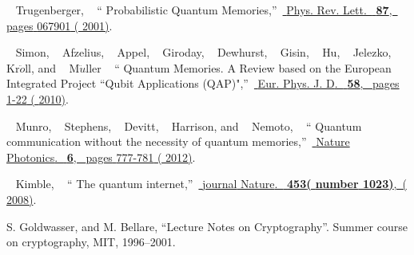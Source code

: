 \documentclass[aps,pra,twocolumn,groupedaddress,showpacs,showkeys]{revtex4-1}
\begin{document}
\begin{thebibliography}{27}
  \BibitemOpen
   { {~\bibnamefont
  {Trugenberger}, } \ }  {\enquote { {Probabilistic Quantum Memories},}\ }\href {\doibase 10.1103/PhysRevLett.87.067901} { { {Phys. Rev. Lett}.\ } \textbf { {87}},\ \bibinfo
  {pages} {067901} ( {2001})}.%
 
  \BibitemOpen
   { {~\bibnamefont
  {Simon}, ~\bibnamefont
  {Afzelius}, ~\bibnamefont
  {Appel}, ~\bibnamefont
  {Giroday}, ~\bibnamefont
  {Dewhurst}, ~\bibnamefont
  {Gisin}, ~\bibnamefont
  {Hu}, ~\bibnamefont
  {Jelezko},~\bibnamefont
  {Kr$\ddot{o}$ll}, and ~\bibnamefont
  {M$\ddot{u}$ller} } \ }  {\enquote { {Quantum Memories. A Review based on the European Integrated Project ``Qubit Applications (QAP)"},}\ }\href {\doibase doi.org/10.1140/epjd/e2010-00103-y} { { {Eur. Phys. J. D}.\ } \textbf { {58}},\ \bibinfo
  {pages} {1-22} ( {2010})}.%

  \BibitemOpen
   { {~\bibnamefont
  {Munro}, ~\bibnamefont
  {Stephens}, ~\bibnamefont
  {Devitt}, ~\bibnamefont
  {Harrison}, and ~\bibnamefont
  {Nemoto},} \ }  {\enquote { {Quantum communication without the necessity of quantum memories},}\ }\href {\doibase 10.1038/nphoton.2012.243} { { {Nature Photonics}.\ } \textbf { {6}},\ \bibinfo
  {pages} {777-781} ( {2012})}.%

  \BibitemOpen
   { {~\bibnamefont
  {Kimble},} \ }  {\enquote { {The quantum internet},}\ }\href {\doibase 10.1038/nature07127} { {\bibinfo
  {journal} {Nature}.\ }\textbf { {453}(\bibinfo
  {number} {1023})},\ ( {2008})}.%

S. Goldwasser, and M. Bellare, \enquote{Lecture Notes on Cryptography}. Summer course on cryptography, MIT, 1996–2001.


\end{thebibliography}
\end{document}
